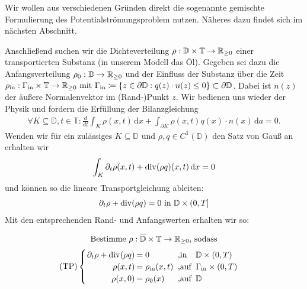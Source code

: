 \begin{Bemerkung}
	Wir wollen aus verschiedenen Gründen direkt die sogenannte gemischte Formulierung des Potentialströmungsproblem nutzen. Näheres dazu findet sich im nächsten Abschnitt.
\end{Bemerkung}
Anschließend suchen wir die Dichteverteilung $\rho: \mathbb{D} \times \mathbb{T} \rightarrow \mathbb{R}_{\geq0} $ einer transportierten Substanz (in unserem Modell das Öl).  \newline
Gegeben sei dazu die Anfangsverteilung $\rho_0: \mathbb{D} \rightarrow \mathbb{R}_{\geq0}$ und der Einfluss der Substanz über die Zeit
$
\rho_{\text{in}} : \Gamma_{\text{in}} \times \mathbb{T} \rightarrow \mathbb{R}_{\geq0} \text{ mit }  \Gamma_{\text{in}} \coloneqq  \{ z \in \partial \mathbb{D}: q(z)\cdot n(z) \leq 0 \} \subset  \partial \mathbb{D}
$.
Dabei ist $n(z)$ der äußere Normalenvektor im (Rand-)Punkt $z$.
Wir bedienen uns wieder der Physik und fordern die Erfüllung der Bilanzgleichung
\begin{align*}
\forall K \subseteq \mathbb{D} , t\in \mathbb{T} : \frac{d}{dt} \int_K \rho(x,t) \, \mathrm{d}x + \int_{\partial K} \rho(x,t)q(x)\cdot n(x) \, \mathrm{d}a = 0.
\end{align*}
Wenden wir für ein zulässiges $K \subseteq \mathbb{D}$ und $\rho,q \in C^1(\mathbb{D})$ den Satz von Gauß an erhalten wir
\begin{align*}
\int_K \partial_t \rho(x,t) + \operatorname{div} (\rho q)(x,t) \, \mathrm{d}x = 0
\end{align*}
und können so die lineare Transportgleichung ableiten:
\begin{align*}
\partial_t \rho + \operatorname{div} (\rho q) = 0 \text{ in } \mathbb{D} \times (0,T]
\end{align*}
Mit den entsprechenden Rand- und Anfangswerten erhalten wir so:

\[ 
\text{Bestimme } \rho: \overline{\mathbb{D}} \times \mathbb{T} \to \R_{\geq 0} \text{, sodass} \newline \]
\[\setlength\arraycolsep{1pt}
\text{(TP)}\begin{cases} 
\begin{array}{rlll}
\partial_t \rho + \dive(\rho q) &= 0 &\text{ ,in } &\mathbb{D} \times (0,T)\\
\rho(x,t) &= \rho_{\text{in}}(x,t) &\text{ ,auf } &\Gamma_{\text{in}} \times (0,T)\\
\rho(x,0) &= \rho_0(x) &\text{ ,auf } &\mathbb{D} \\
\end{array}
\end{cases} \\
\]

